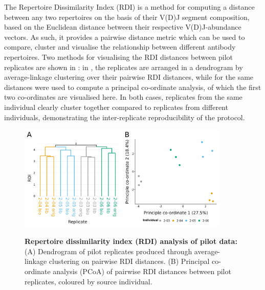 The Repertoire Dissimilarity Index (RDI) %
is a method for computing a distance between any two repertoires on the basis of their V(D)J segment composition, based on the Euclidean distance between their respective V(D)J-abundance vectors. As such, it provides a pairwise distance metric which can be used to compare, cluster and visualise the relationship between different antibody repertoires. Two methods for visualising the RDI distances between pilot replicates are shown in : in , the replicates are arranged in a dendrogram by average-linkage clustering over their pairwise RDI distances, while for  the same distances were used to compute a principal co-ordinate analysis, %
of which the first two co-ordinates are visualised here. In both cases, replicates from the same individual clearly cluster together compared to replicates from different individuals, demonstrating the inter-replicate reproducibility of the \igseq protocol.

\begin{figure}
\centering
\includegraphics[width = 0.9\textwidth]{_Figures/png/pilot-rdi-VDJ}
\begin{subfigure}{0em}
\label{fig:igseq-pilot-rdi-dendrogram}
\end{subfigure}
\begin{subfigure}{0em}
\label{fig:igseq-pilot-rdi-pcoa}
\end{subfigure}
\caption[Repertoire dissimilarity index (RDI) analysis of pilot data]{\textbf{Repertoire dissimilarity index (RDI) analysis of pilot data:} (A) Dendrogram of pilot replicates produced through average-linkage clustering on pairwise RDI distances. (B) Principal co-ordinate analysis (PCoA) of pairwise RDI distances between pilot replicates, coloured by source individual.}
\label{fig:igseq-pilot-rdi}
\end{figure}

